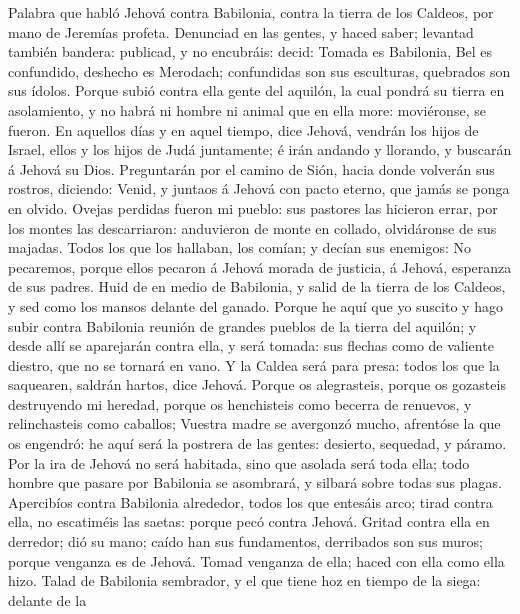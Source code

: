  Palabra que habló Jehová contra Babilonia, contra la tierra
de los Caldeos, por mano de Jeremías profeta.  Denunciad en
las gentes, y haced saber; levantad también bandera: publicad, y no
encubráis: decid: Tomada es Babilonia, Bel es confundido, deshecho es
Merodach; confundidas son sus esculturas, quebrados son sus ídolos.
 Porque subió contra ella gente del aquilón, la cual pondrá
su tierra en asolamiento, y no habrá ni hombre ni animal que en ella
more: moviéronse, se fueron.  En aquellos días y en aquel
tiempo, dice Jehová, vendrán los hijos de Israel, ellos y los hijos de
Judá juntamente; é irán andando y llorando, y buscarán á Jehová su Dios.
 Preguntarán por el camino de Sión, hacia donde volverán sus
rostros, diciendo: Venid, y juntaos á Jehová con pacto eterno, que jamás
se ponga en olvido.  Ovejas perdidas fueron mi pueblo: sus
pastores las hicieron errar, por los montes las descarriaron: anduvieron
de monte en collado, olvidáronse de sus majadas.  Todos los
que los hallaban, los comían; y decían sus enemigos: No pecaremos,
porque ellos pecaron á Jehová morada de justicia, á Jehová, esperanza de
sus padres.  Huid de en medio de Babilonia, y salid de la
tierra de los Caldeos, y sed como los mansos delante del ganado.
 Porque he aquí que yo suscito y hago subir contra Babilonia
reunión de grandes pueblos de la tierra del aquilón; y desde allí se
aparejarán contra ella, y será tomada: sus flechas como de valiente
diestro, que no se tornará en vano.  Y la Caldea será para
presa: todos los que la saquearen, saldrán hartos, dice Jehová.
 Porque os alegrasteis, porque os gozasteis destruyendo mi
heredad, porque os henchisteis como becerra de renuevos, y relinchasteis
como caballos;  Vuestra madre se avergonzó mucho, afrentóse
la que os engendró: he aquí será la postrera de las gentes: desierto,
sequedad, y páramo.  Por la ira de Jehová no será habitada,
sino que asolada será toda ella; todo hombre que pasare por Babilonia se
asombrará, y silbará sobre todas sus plagas.  Apercibíos
contra Babilonia alrededor, todos los que entesáis arco; tirad contra
ella, no escatiméis las saetas: porque pecó contra Jehová. 
Gritad contra ella en derredor; dió su mano; caído han sus fundamentos,
derribados son sus muros; porque venganza es de Jehová. Tomad venganza
de ella; haced con ella como ella hizo.  Talad de Babilonia
sembrador, y el que tiene hoz en tiempo de la siega: delante de la
